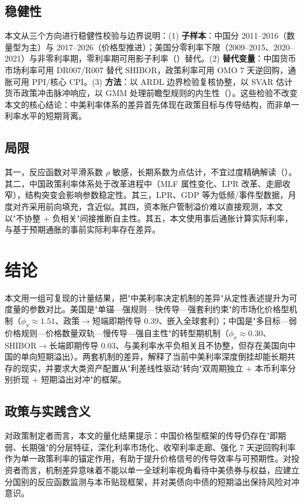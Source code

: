 \documentclass[12pt,a4paper]{ctexart}
\renewcommand{\citealp}[1]{\citep{#1}}
\begin{document}
\subsection{稳健性}
本文从三个方向进行稳健性校验与边界说明：(1) \textbf{子样本}：中国分 2011--2016（数量型为主）与 2017--2026（价格型推进）；美国分零利率下限（2009--2015、2020--2021）与非零利率期，零利率期可用影子利率（\citealp{wuxia2016}）替代。(2) \textbf{替代变量}：中国货币市场利率可用 DR007/R007 替代 SHIBOR，政策利率可用 OMO 7 天逆回购，通胀可用 PPI/核心 CPI。(3) \textbf{方法}：以 ARDL 边界检验复核协整，以 SVAR 估计货币政策冲击脉冲响应，以 GMM 处理前瞻型规则的内生性（\citealp{clarida2000}）。这些检验不改变本文的核心结论：中美利率体系的差异首先体现在政策目标与传导结构，而非单一利率水平的短期背离。

\subsection{局限}
其一，反应函数对平滑系数 $\rho$ 敏感，长期系数为点估计，不宜过度精确解读（\citealp{rudebusch2002}）。其二，中国政策利率体系处于改革进程中（MLF 属性变化、LPR 改革、走廊收窄），结构突变会影响参数稳定性。其三，LPR、GDP 等为低频/事件型数据，月度对齐采用前向填充，含近似。其四，资本账户管制溢价难以直接观测，本文以"不协整 $+$ 负相关"间接推断自主性。其五，本文使用事后通胀计算实际利率，与基于预期通胀的事前实际利率存在差异。

\section{结论}
本文用一组可复现的计量结果，把"中美利率决定机制的差异"从定性表述提升为可度量的参数对比。美国是"单锚—强规则—快传导—强套利约束"的市场化价格型机制（$\phi_\pi\approx1.51$、政策$\to$短端即期传导 0.39、嵌入全球套利）；中国是"多目标—弱价格规则—价格数量双轨—慢传导—强自主性"的转型期机制（$\phi_\pi\approx0.30$、SHIBOR$\to$长端即期传导 0.03、与美利率水平负相关且不协整，但存在美国向中国的单向短期溢出）。两套机制的差异，解释了当前中美利率深度倒挂却能长期共存的现实，并要求大类资产配置从"利差线性驱动"转向"双周期独立 $+$ 本币利率分别折现 $+$ 短期溢出对冲"的框架。

\subsection{政策与实践含义}
对政策制定者而言，本文的量化结果提示：中国价格型框架的传导仍存在"即期弱、长期强"的分层特征，深化利率市场化、收窄利率走廊、强化 7 天逆回购利率作为单一政策利率的锚定作用，有助于提升价格信号的传导效率与可预期性。对投资者而言，机制差异意味着不能以单一全球利率视角看待中美债券与权益，应建立分国别的反应函数监测与本币贴现框架，并对美债向中债的短期溢出保持风险对冲意识。
\end{document}
